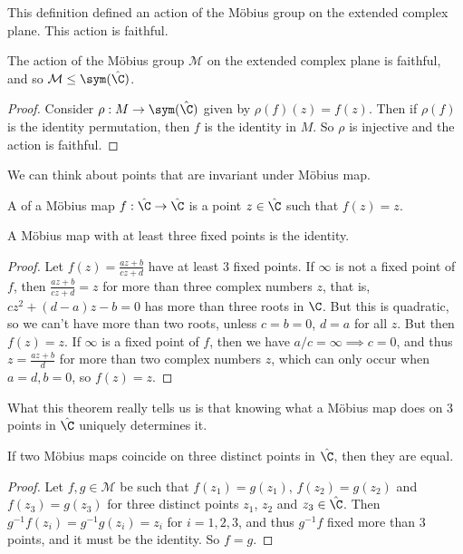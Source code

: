 \documentclass[a4]{scrreprt}
\begin{document}
This definition defined an action of the Möbius group on the extended complex plane. This action is faithful.

\begin{proposition}
	The action of the Möbius group $\mathcal{M}$ on the extended complex plane is faithful, and so $\mathcal{M} \leq \sym(\hat{\C})$.
\end{proposition}
\begin{proof}
	Consider $\rho : M \rightarrow \sym(\hat{\C})$ given by $\rho(f)(z) = f(z)$. Then if $\rho(f)$ is the identity permutation, then $f$ is the identity in $M$. So $\rho$ is injective and the action is faithful.
\end{proof}

We can think about points that are invariant under Möbius map.

\begin{definition}
	A  of a Möbius map $f: \hat{\C} 	\rightarrow \hat{\C}$ is a point $z \in \hat{\C}$ such that $f(z) = z$.
\end{definition}

\begin{theorem}
	A Möbius map with at least three fixed points is the identity.
\end{theorem}
\begin{proof}
Let $f(z) = \frac{az + b}{cz + d}$ have at least 3 fixed points. If $\infty$ is not a fixed point of $f$, then $\frac{az + b}{cz + d} = z$ for more than three complex numbers $z$, that is, $cz^2 + (d - a)z - b = 0$ has more than three roots in $\C$. But this is quadratic, so we can't have more than two roots, unless $c = b = 0$, $d = a$ for all $z$. But then $f(z) = z$. If $\infty$ is a fixed point of $f$, then we have $a/c = \infty \implies c = 0$, and thus $z = \frac{az + b}{d}$ for more than two complex numbers $z$, which can only occur when $a = d, b = 0$, so $f(z) = z$.
\end{proof}

What this theorem really tells us is that knowing what a Möbius map does on 3 points in $\hat{\C}$ uniquely determines it.

\begin{corollary}
	If two Möbius maps coincide on three distinct points in $\hat{\C}$, then they are equal.
\end{corollary}
\begin{proof}
	Let $f, g \in \mathcal{M}$ be such that $f(z_1) = g(z_1)$, $f(z_2) = g(z_2)$ and $f(z_3) = g(z_3)$ for three distinct points $z_1$, $z_2$ and $z_3 \in \hat{\C}$. Then $g^{-1}f(z_i) = g^{-1} g(z_i) = z_i$ for $i = 1, 2, 3$, and thus $g^{-1}f$ fixed more than 3 points, and it must be the identity. So $f = g$.
\end{proof}
\end{document}
